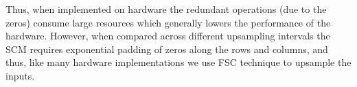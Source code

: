 \documentclass[journal]{IEEEtran}
\begin{document}
\begin{table}[htb]
    \centering
	\renewcommand{\arraystretch}{1}
	\caption{The number of zeros added for different upsampling intervals.}
	\label{table2}
\end{table}

Thus, when implemented on hardware the redundant operations (due to the zeros) consume large resources which generally lowers the performance of the hardware. However, when compared across different upsampling intervals the SCM requires exponential padding of zeros along the rows and columns, and thus, like many hardware implementations \cite{inproceedings2,article3} we use FSC technique to upsample the inputs.
\end{document}

